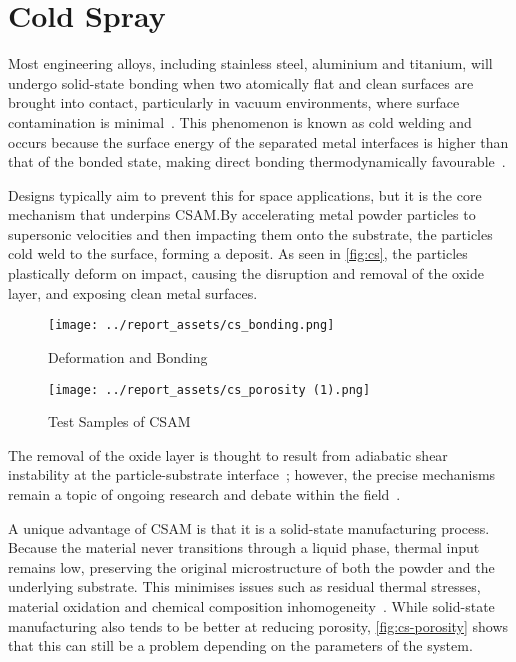 
\section{Cold Spray}\label{sec:cold-spray}
Most engineering alloys, including stainless steel, aluminium and titanium, will undergo solid-state bonding when two atomically flat and clean surfaces are brought into contact, particularly in vacuum environments, where surface contamination is minimal~\cite{merstallinger2009coldwelding}. This phenomenon is known as cold welding and occurs because the surface energy of the separated metal interfaces is higher than that of the bonded state, making direct bonding thermodynamically favourable~\cite{WagleBaker2015}. 

Designs typically aim to prevent this for space applications, but it is the core mechanism that underpins CSAM.\@ By accelerating metal powder particles to supersonic velocities and then impacting them onto the substrate, the particles cold weld to the surface, forming a deposit. As seen in \autoref{fig:cs}, the particles plastically deform on impact, causing the disruption and removal of the oxide layer, and exposing clean metal surfaces. 
\begin{figure}[htbp]
    \centering
    
    \begin{minipage}{0.45\textwidth}
        \centering
        \texttt{[image: ../report\_assets/cs\_bonding.png]}
        \caption{Deformation and Bonding~\cite{ZHANG2024137157}}\label{fig:cs}
    \end{minipage}
    \hfill
    \begin{minipage}{0.45\textwidth}
        \centering
        \texttt{[image: ../report\_assets/cs\_porosity (1).png]}
        \caption{Test Samples of CSAM~\cite{coatings13040738}}\label{fig:cs-porosity}
    \end{minipage}
    
\end{figure}
The removal of the oxide layer is thought to result from adiabatic shear instability at the particle-substrate interface~\cite{assadi2016cold}; however, the precise mechanisms remain a topic of ongoing research and debate within the field~\cite{HASSANIGANGARAJ2018430}.

A unique advantage of CSAM is that it is a solid-state manufacturing process. Because the material never transitions through a liquid phase, thermal input remains low, preserving the original microstructure of both the powder and the underlying substrate. This minimises issues such as residual thermal stresses, material oxidation and chemical composition inhomogeneity~\cite{ma16072765}. While solid-state manufacturing also tends to be better at reducing porosity, \autoref{fig:cs-porosity} shows that this can still be a problem depending on the parameters of the system. 

